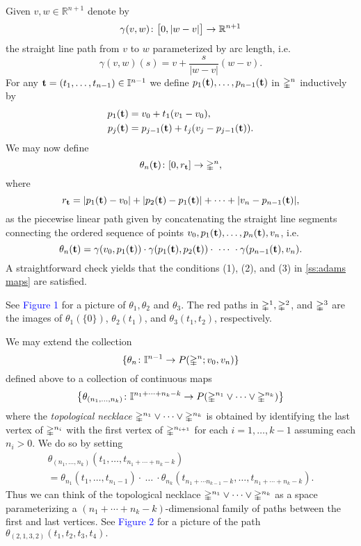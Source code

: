 Given $v,w \in \mathbb{R}^{n+1}$ denote by
\[
\gamma(v,w) \colon \big[0, \bars{w-v}\big] \to \mathbb{R}^{n+1}
\]
the straight line path from $v$ to $w$ parameterized by arc length, i.e.
\[
\gamma(v,w)(s) = v + \frac{s}{|w-v|}(w-v).
\]
For any $\bft=(t_1, \dots, t_{n-1}) \in \gcube^{n-1}$ we define $p_1(\bft), \dots, p_{n-1}(\bft)$ in $\gsimplex^n$ inductively by
\[
\begin{split}
	p_1(\bft) &= v_0+ t_1(v_1-v_0), \\
	p_j(\bft) &= p_{j-1}(\bft) + t_j(v_j-p_{j-1}(\bft)).
\end{split}
\]
We may now define
\[
\theta_n(\bft) \colon [0, r_{\bft}] \to \gsimplex^n,
\]
where
\[
r_{\bft} = \bars{p_1(\bft)-v_0} + \bars{p_2(\bft)-p_1(\bft)} + \dots + \bars{v_n-p_{n-1}(\bft)},
\]
as the piecewise linear path given by concatenating the straight line segments connecting the ordered sequence of points $v_0, p_1(\bft), \dots, p_n(\bft), v_n$, i.e.
\[
\theta_n(\bft) =
\gamma(v_0,p_1(\bft)) \cdot \gamma(p_1(\bft), p_2(\bft)) \cdot\ \dotsb\ \cdot \gamma(p_{n-1}(\bft),v_n).
\]
A straightforward check yields that the conditions (1), (2), and (3) in \cref{ss:adams maps} are satisfied.

See \textcolor{blue}{Figure 1} for a picture of $\theta_1, \theta_2$ and $\theta_3$. The red paths in $\gsimplex^1, \gsimplex^2$, and $\gsimplex^3$ are the images of $\theta_1(\{0\})$, $\theta_2(t_1)$, and $\theta_3(t_1,t_2)$, respectively.

We may extend the collection
\[
\{\theta_n \colon \gcube^{n-1} \to P(\gsimplex^n;v_0,v_n)\}
\]
defined above to a collection of continuous maps
\[
\set[\big]{\theta_{(n_1, \dots, n_k)} \colon \gcube^{n_1 + \dots + n_k-k} \to P(\gsimplex^{n_1} \vee \cdots \vee \gsimplex^{n_k})}
\]
where the \textit{topological necklace} $\gsimplex^{n_1} \vee \cdots \vee \gsimplex^{n_k}$ is obtained by identifying the last vertex of $\gsimplex^{n_i}$ with the first vertex of $\gsimplex^{n_{i+1}}$ for each $i = 1, \dots, k-1$ assuming each $n_i > 0$.
We do so by setting
\begin{multline*}
	\theta_{(n_1, \ldots, n_k)}(t_1, \ldots, t_{n_1+ \cdots + n_k-k}) \\ =
	\theta_{n_1}(t_1, \ldots, t_{n_1-1}) \cdot\ \dots\ \cdot \theta_{n_k}(t_{n_1+ \cdots n_{k-1}-k},\ldots,t_{n_1 + \cdots +n_k-k}).
\end{multline*}
Thus we can think of the topological necklace $\gsimplex^{n_1} \vee \cdots \vee \gsimplex^{n_k}$ as a space parameterizing a $(n_1+ \cdots + n_k-k)$-dimensional family of paths between the first and last vertices. See \textcolor{blue}{Figure 2} for a picture of the path $\theta_{(2,1,3,2)}(t_1,t_2,t_3,t_4).$

